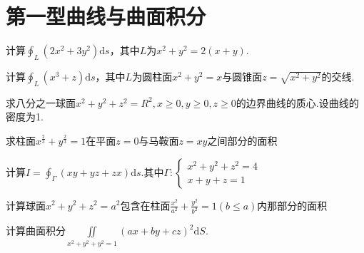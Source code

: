 \section{第一型曲线与曲面积分}%
\begin{xiti}
	\item 	计算$\oint_{L}\left(2 x^{2}+3 y^{2}\right) \mathrm{d} s$，其中$L$为$x^{2}+y^{2}=2(x+y)$.
	\begin{solution}
	\end{solution}
	
	\item 计算$\oint_{L}\left(x^{3}+z\right) \mathrm{d} s$，其中$L$为圆柱面$x^{2}+y^{2}=x$与圆锥面$z=\sqrt{x^{2}+y^{2}}$的交线.
	\begin{solution}
	\end{solution}
	
	\item 求八分之一球面$x^{2}+y^{2}+z^{2}=R^{2}, x \geqslant 0, y \geqslant 0, z \geqslant 0$的边界曲线的质心.设曲线的密度为1.
	\begin{solution}
	\end{solution}
	
	\item 求柱面$ x^{\frac{2}{3}}+y^{\frac{2}{3}}=1$在平面$z=0$与马鞍面$z=xy$之间部分的面积
	\begin{solution}
	\end{solution}
	
	\item 计算$I=\oint_{\Gamma}(x y+y z+z x) \mathrm{d} s$.其中$\Gamma : \left\{\begin{array}{l}{x^{2}+y^{2}+z^{2}=4} \\ {x+y+z=1}\end{array}\right.$
	\begin{solution}
	\end{solution}
	
	\item 	计算球面$x^{2}+y^{2}+z^{2}=a^{2}$包含在柱面$\frac{x^{2}}{a^{2}}+\frac{y^{2}}{b^{2}}=1(b \leq a)$内那部分的面积
	\begin{solution}
	\end{solution}
	
	\item 计算曲面积分$\iint\limits_{x^2+y^2+y^2=1}{\left(ax+by+cz\right)^2\textrm{d}S}$.
	\begin{solution}
	\end{solution}
	

\end{xiti}
